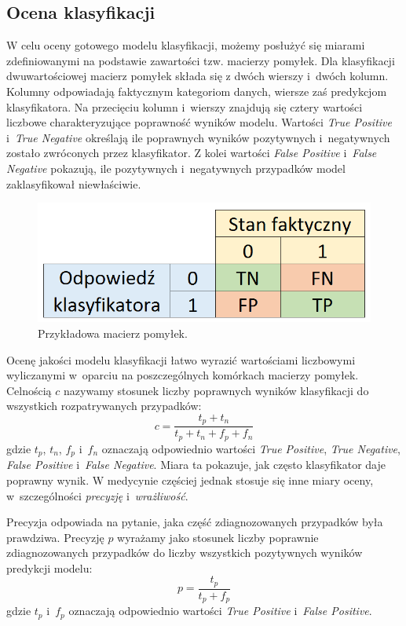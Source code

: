 \documentclass[../thesis.tex]{subfiles}
\begin{document}
\subsection{Ocena klasyfikacji}

W celu oceny gotowego modelu klasyfikacji, możemy posłużyć się miarami zdefiniowanymi na podstawie zawartości tzw. macierzy pomyłek. Dla klasyfikacji dwuwartościowej macierz pomyłek składa się z dwóch wierszy i~dwóch kolumn. Kolumny odpowiadają faktycznym kategoriom danych, wiersze zaś predykcjom klasyfikatora. Na przecięciu kolumn i~wierszy znajdują się cztery wartości liczbowe charakteryzujące poprawność wyników modelu. Wartości \emph{True Positive} i~\emph{True Negative} określają ile poprawnych wyników pozytywnych i~negatywnych zostało zwróconych przez klasyfikator. Z kolei wartości \emph{False Positive} i~\emph{False Negative} pokazują, ile pozytywnych i~negatywnych przypadków model zaklasyfikował niewłaściwie.

\begin{figure}[h]
\centering
\includegraphics[height=.1\textheight]{error_matrix.png}
\caption{Przykładowa macierz pomyłek.}
\label{classification:error_matrix}
\end{figure}

Ocenę jakości modelu klasyfikacji łatwo wyrazić wartościami liczbowymi wyliczanymi w~oparciu na poszczególnych komórkach macierzy pomyłek. Celnością $c$ nazywamy stosunek liczby poprawnych wyników klasyfikacji do wszystkich rozpatrywanych przypadków:
\[c = \frac{t_p + t_n}{t_p + t_n + f_p + f_n}\]
gdzie $t_p$, $t_n$, $f_p$ i~$f_n$ oznaczają odpowiednio wartości \emph{True Positive}, \emph{True Negative}, \emph{False Positive} i~\emph{False Negative}. Miara ta pokazuje, jak często klasyfikator daje poprawny wynik. W medycynie częściej jednak stosuje się inne miary oceny, w~szczególności \emph{precyzję} i~\emph{wrażliwość}. 

Precyzja odpowiada na pytanie, jaka część zdiagnozowanych przypadków była prawdziwa. Precyzję $p$ wyrażamy jako stosunek liczby poprawnie zdiagnozowanych przypadków do liczby wszystkich pozytywnych wyników predykcji modelu:
\[p = \frac{t_p}{t_p + f_p}\]
gdzie $t_p$ i~$f_p$ oznaczają odpowiednio wartości \emph{True Positive} i~\emph{False Positive}.
\end{document}
